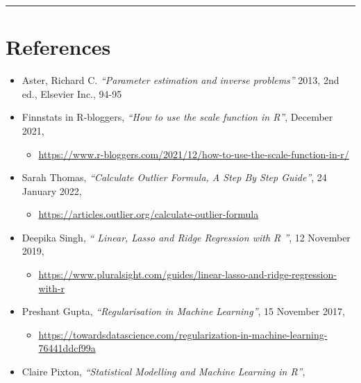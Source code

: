 \documentclass[
]{article}
\providecommand{\tightlist}{%
  \setlength{\itemsep}{0pt}\setlength{\parskip}{0pt}}
\begin{document}
\begin{center}\rule{0.5\linewidth}{0.5pt}\end{center}

\newpage

\hypertarget{references}{%
\section{References}\label{references}}

\begin{itemize}
\item
  Aster, Richard C. \emph{``Parameter estimation and inverse problems''}
  2013, 2nd ed., Elsevier Inc., 94-95
\item
  Finnstats in R-bloggers, \emph{``How to use the scale function in
  R''}, December 2021,

  \begin{itemize}
  \tightlist
  \item
    \url{https://www.r-bloggers.com/2021/12/how-to-use-the-scale-function-in-r/}
  \end{itemize}
\item
  Sarah Thomas, \emph{``Calculate Outlier Formula, A Step By Step
  Guide''}, 24 January 2022,

  \begin{itemize}
  \tightlist
  \item
    \url{https://articles.outlier.org/calculate-outlier-formula}
  \end{itemize}
\item
  Deepika Singh, \emph{`` Linear, Lasso and Ridge Regression with R ''},
  12 November 2019,

  \begin{itemize}
  \tightlist
  \item
    \url{https://www.pluralsight.com/guides/linear-lasso-and-ridge-regression-with-r}
  \end{itemize}
\item
  Preshant Gupta, \emph{``Regularisation in Machine Learning''}, 15
  November 2017,

  \begin{itemize}
  \tightlist
  \item
    \url{https://towardsdatascience.com/regularization-in-machine-learning-76441ddcf99a}
  \end{itemize}
\item
  Claire Pixton, \emph{``Statistical Modelling and Machine Learning in
  R''},


\end{itemize}
\end{document}
